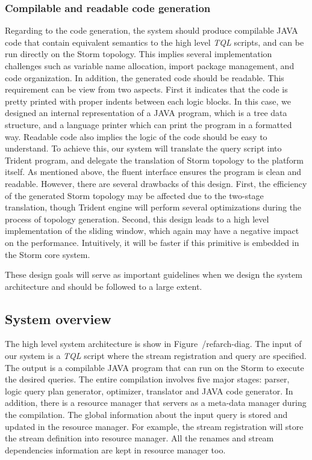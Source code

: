 \documentclass[conference, twocolumn, twoside, 11pt]{IEEEtran}
\theoremstyle{definition}
\begin{document}
\subsubsection{Compilable and readable code generation}
Regarding to the code generation, the system should produce compilable JAVA code that contain equivalent semantics to the high level \emph{TQL} scripts, and can be run directly on the Storm topology. This implies several implementation challenges such as variable name allocation, import package management, and code organization. In addition, the generated code should be readable. This requirement can be view from two aspects. First it indicates that the code is pretty printed with proper indents between each logic blocks. In this case, we designed an internal representation of a JAVA program, which is a tree data structure, and a language printer which can print the program in a formatted way. Readable code also implies the logic of the code should be easy to understand. To achieve this, our system will translate the query script into Trident program, and delegate the translation of Storm topology to the platform itself. As mentioned above, the fluent interface ensures the program is clean and readable. However, there are several drawbacks of this design. First, the efficiency of the generated Storm topology may be affected due to the two-stage translation, though Trident engine will perform several optimizations during the process of topology generation. Second, this design leads to a high level implementation of the sliding window, which again may have a negative impact on the performance. Intuitively, it will be faster if this primitive is embedded in the Storm core system.

These design goals will serve as important guidelines when we design the system architecture and should be followed to a large extent. 
\subsection{System overview}
The high level system architecture is show in Figure~/ref{arch-diag}. The input of our system is a \emph{TQL} script where the stream registration and query are specified. The output is a compilable JAVA program that can run on the Storm to execute the desired queries. The entire compilation involves five major stages: parser, logic query plan generator, optimizer, translator and JAVA code generator. In addition, there is a resource manager that servers as a meta-data manager during the compilation. The global information about the input query is stored and updated in the resource manager. For example, the stream registration will store the stream definition into resource manager. All the renames and stream dependencies information are kept in resource manager too.
\end{document}
